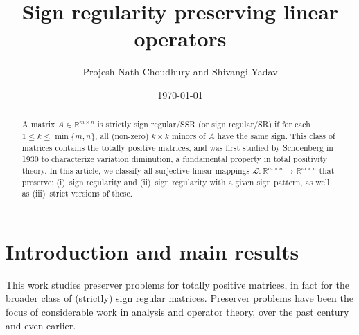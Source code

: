 \documentclass[11pt,reqno]{amsart}
\theoremstyle{plain}
\theoremstyle{definition}
\numberwithin{equation}{section}
\begin{document}
	\title[ Sign regularity preserving linear operators
	]{Sign regularity preserving linear operators}
	
	\author{Projesh Nath Choudhury and Shivangi Yadav}
	\address[P.N.~Choudhury]{Department of Mathematics, Indian Institute of Technology Gandhinagar, Gujarat 382355, India}
	\address[S.~Yadav]{Department of Mathematics, Indian Institute of Technology Gandhinagar, Gujarat 382355, India; Ph.D. Student}
	
	\date{\today}
	
	\begin{abstract}
		A matrix $A\in \mathbb{R}^{m \times n}$ is strictly sign regular/SSR (or sign regular/SR) if for each $1 \leq k \leq \min\{m,n\}$, all (non-zero) $k\times k$ minors of $A$ have the same sign. This class of matrices contains the totally positive matrices, and was first studied by Schoenberg in 1930 to characterize variation diminution, a fundamental property in total positivity theory. In this article, we classify all surjective linear mappings $\mathcal{L}:\mathbb{R}^{m\times n}\to\mathbb{R}^{m\times n}$ that preserve: (i)~sign regularity and (ii)~sign regularity with a given sign pattern, as well as (iii)~strict versions of these.
	\end{abstract}
	
	
	
	\maketitle
	
	\vspace*{-9mm}
	\tableofcontents



\section{Introduction and main results} \label{section introduction}

This work studies preserver problems for totally positive matrices, in
fact for the broader class of (strictly) sign regular matrices. Preserver problems have been the focus of considerable work in analysis and operator theory, over the past century and even earlier.
\end{document}
